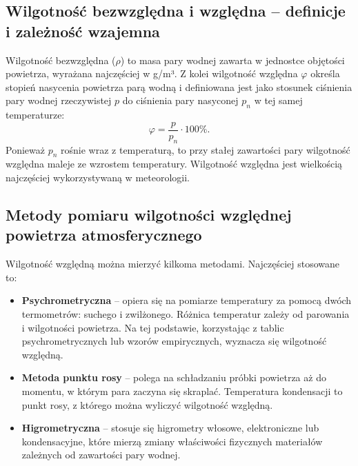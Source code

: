 \documentclass[12pt]{article}
\begin{document}
\subsection*{Wilgotność bezwzględna i względna – definicje i zależność wzajemna}
Wilgotność bezwzględna ($\rho$) to masa pary wodnej zawarta w jednostce objętości powietrza, wyrażana najczęściej w g/m³. Z kolei wilgotność względna $\varphi$ określa stopień nasycenia powietrza parą wodną i definiowana jest jako stosunek ciśnienia pary wodnej rzeczywistej $p$ do ciśnienia pary nasyconej $p_n$ w tej samej temperaturze:
\[
    \varphi = \frac{p}{p_n} \cdot 100\%.
\]
Ponieważ $p_n$ rośnie wraz z temperaturą, to przy stałej zawartości pary wilgotność względna maleje ze wzrostem temperatury. Wilgotność względna jest wielkością najczęściej wykorzystywaną w meteorologii.

\subsection*{Metody pomiaru wilgotności względnej powietrza atmosferycznego}
Wilgotność względną można mierzyć kilkoma metodami. Najczęściej stosowane to:
\begin{itemize}[label=--]
    \item \textbf{Psychrometryczna} – opiera się na pomiarze temperatury za pomocą dwóch termometrów: suchego i zwilżonego. Różnica temperatur zależy od parowania i wilgotności powietrza. Na tej podstawie, korzystając z tablic psychrometrycznych lub wzorów empirycznych, wyznacza się wilgotność względną.
    \item \textbf{Metoda punktu rosy} – polega na schładzaniu próbki powietrza aż do momentu, w którym para zaczyna się skraplać. Temperatura kondensacji to punkt rosy, z którego można wyliczyć wilgotność względną.
    \item \textbf{Higrometryczna} – stosuje się higrometry włosowe, elektroniczne lub kondensacyjne, które mierzą zmiany właściwości fizycznych materiałów zależnych od zawartości pary wodnej.
\end{itemize}
\end{document}
